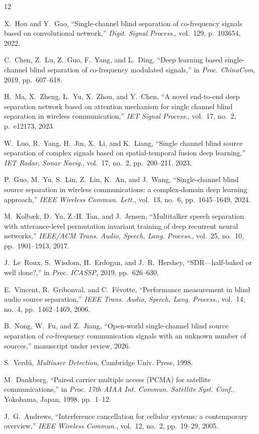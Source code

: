 \documentclass[journal]{IEEEtran}
\begin{document}
\begin{thebibliography}{12}\footnotesize

X.~Hou and Y.~Gao,
``Single-channel blind separation of co-frequency signals based on
convolutional network,''
\emph{Digit. Signal Process.}, vol.~129, p.~103654, 2022.

C.~Chen, Z.~Lu, Z.~Guo, F.~Yang, and L.~Ding,
``Deep learning based single-channel blind separation of co-frequency
modulated signals,''
in \emph{Proc. ChinaCom}, 2019, pp.~607--618.

H.~Ma, X.~Zheng, L.~Yu, X.~Zhou, and Y.~Chen,
``A novel end-to-end deep separation network based on attention
mechanism for single channel blind separation in wireless
communication,''
\emph{IET Signal Process.}, vol.~17, no.~2, p.~e12173, 2023.

W.~Luo, R.~Yang, H.~Jin, X.~Li, and K.~Liang,
``Single channel blind source separation of complex signals based on
spatial-temporal fusion deep learning,''
\emph{IET Radar, Sonar Navig.}, vol.~17, no.~2, pp.~200--211, 2023.

P.~Guo, M.~Yu, S.~Lin, Z.~Lin, K.~An, and J.~Wang,
``Single-channel blind source separation in wireless communications: a
complex-domain deep learning approach,''
\emph{IEEE Wireless Commun. Lett.}, vol.~13, no.~6, pp.~1645--1649,
2024.

M.~Kolb{\ae}k, D.~Yu, Z.-H. Tan, and J.~Jensen,
``Multitalker speech separation with utterance-level permutation
invariant training of deep recurrent neural networks,''
\emph{IEEE/ACM Trans. Audio, Speech, Lang. Process.}, vol.~25, no.~10,
pp.~1901--1913, 2017.

J.~Le~Roux, S.~Wisdom, H.~Erdogan, and J.~R.~Hershey,
``SDR---half-baked or well done?,''
in \emph{Proc. ICASSP}, 2019, pp.~626--630.

E.~Vincent, R.~Gribonval, and C.~F{\'e}votte,
``Performance measurement in blind audio source separation,''
\emph{IEEE Trans. Audio, Speech, Lang. Process.}, vol.~14, no.~4,
pp.~1462--1469, 2006.

B.~Nong, W.~Fu, and Z.~Jiang,
``Open-world single-channel blind source separation of co-frequency
communication signals with an unknown number of sources,''
manuscript under review, 2026.

S.~Verd{\'u},
\emph{Multiuser Detection},
Cambridge Univ. Press, 1998.

M.~Dankberg,
``Paired carrier multiple access (PCMA) for satellite communications,''
in \emph{Proc. 17th AIAA Int. Commun. Satellite Syst. Conf.},
Yokohama, Japan, 1998, pp.~1--12.

J.~G.~Andrews,
``Interference cancellation for cellular systems: a contemporary
overview,''
\emph{IEEE Wireless Commun.}, vol.~12, no.~2, pp.~19--29, 2005.

\end{thebibliography}
\end{document}
